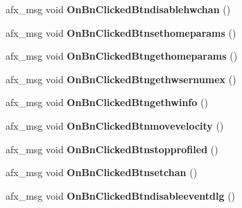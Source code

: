 \begin{DoxyCompactItemize}
\item 
afx\+\_\+msg void {\bfseries On\+Bn\+Clicked\+Btndisablehwchan} ()\hypertarget{class_c_a_p_t_d_l_l_client_dlg_ad5d1743ceb865f844836e9e84f6c085e}{}\label{class_c_a_p_t_d_l_l_client_dlg_ad5d1743ceb865f844836e9e84f6c085e}

\item 
afx\+\_\+msg void {\bfseries On\+Bn\+Clicked\+Btnsethomeparams} ()\hypertarget{class_c_a_p_t_d_l_l_client_dlg_a6aea60fb9924a9025c2d7901053f5456}{}\label{class_c_a_p_t_d_l_l_client_dlg_a6aea60fb9924a9025c2d7901053f5456}

\item 
afx\+\_\+msg void {\bfseries On\+Bn\+Clicked\+Btngethomeparams} ()\hypertarget{class_c_a_p_t_d_l_l_client_dlg_ac5adb228384405e04de6df22a778dc51}{}\label{class_c_a_p_t_d_l_l_client_dlg_ac5adb228384405e04de6df22a778dc51}

\item 
afx\+\_\+msg void {\bfseries On\+Bn\+Clicked\+Btngethwsernumex} ()\hypertarget{class_c_a_p_t_d_l_l_client_dlg_a63650f051e73ebf7bfeb98c6110704db}{}\label{class_c_a_p_t_d_l_l_client_dlg_a63650f051e73ebf7bfeb98c6110704db}

\item 
afx\+\_\+msg void {\bfseries On\+Bn\+Clicked\+Btngethwinfo} ()\hypertarget{class_c_a_p_t_d_l_l_client_dlg_a26aed59e5984a9b9887cc53839c6fb32}{}\label{class_c_a_p_t_d_l_l_client_dlg_a26aed59e5984a9b9887cc53839c6fb32}

\item 
afx\+\_\+msg void {\bfseries On\+Bn\+Clicked\+Btnmovevelocity} ()\hypertarget{class_c_a_p_t_d_l_l_client_dlg_aab9de895a19c1a15769777dddacfae7b}{}\label{class_c_a_p_t_d_l_l_client_dlg_aab9de895a19c1a15769777dddacfae7b}

\item 
afx\+\_\+msg void {\bfseries On\+Bn\+Clicked\+Btnstopprofiled} ()\hypertarget{class_c_a_p_t_d_l_l_client_dlg_ab66a8edc2e5b138d36e54fed58ee9e0e}{}\label{class_c_a_p_t_d_l_l_client_dlg_ab66a8edc2e5b138d36e54fed58ee9e0e}

\item 
afx\+\_\+msg void {\bfseries On\+Bn\+Clicked\+Btnsetchan} ()\hypertarget{class_c_a_p_t_d_l_l_client_dlg_acc6f4c9882fce5f4d372304553a5ea7f}{}\label{class_c_a_p_t_d_l_l_client_dlg_acc6f4c9882fce5f4d372304553a5ea7f}

\item 
afx\+\_\+msg void {\bfseries On\+Bn\+Clicked\+Btndisableeventdlg} ()\hypertarget{class_c_a_p_t_d_l_l_client_dlg_a4a69091733a1b4c96c51e29380b543ab}{}\label{class_c_a_p_t_d_l_l_client_dlg_a4a69091733a1b4c96c51e29380b543ab}


\end{DoxyCompactItemize}
